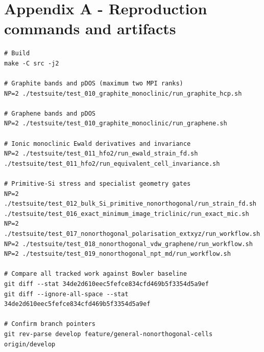 \documentclass[10pt,a4paper]{report}
\begin{document}
\chapter{Appendix A - Reproduction commands and artifacts}
\begin{lstlisting}
# Build
make -C src -j2

# Graphite bands and pDOS (maximum two MPI ranks)
NP=2 ./testsuite/test_010_graphite_monoclinic/run_graphite_hcp.sh

# Graphene bands and pDOS
NP=2 ./testsuite/test_010_graphite_monoclinic/run_graphene.sh

# Ionic monoclinic Ewald derivatives and invariance
NP=2 ./testsuite/test_011_hfo2/run_ewald_strain_fd.sh
./testsuite/test_011_hfo2/run_equivalent_cell_invariance.sh

# Primitive-Si stress and specialist geometry gates
NP=2 ./testsuite/test_012_bulk_Si_primitive_nonorthogonal/run_strain_fd.sh
./testsuite/test_016_exact_minimum_image_triclinic/run_exact_mic.sh
NP=2 ./testsuite/test_017_nonorthogonal_polarisation_extxyz/run_workflow.sh
NP=2 ./testsuite/test_018_nonorthogonal_vdw_graphene/run_workflow.sh
NP=2 ./testsuite/test_019_nonorthogonal_npt_md/run_workflow.sh

# Compare all tracked work against Bowler baseline
git diff --stat 34de2d610eec5fefce834cfd469b5f3354d5a9ef
git diff --ignore-all-space --stat 34de2d610eec5fefce834cfd469b5f3354d5a9ef

# Confirm branch pointers
git rev-parse develop feature/general-nonorthogonal-cells origin/develop
\end{lstlisting}
\end{document}
